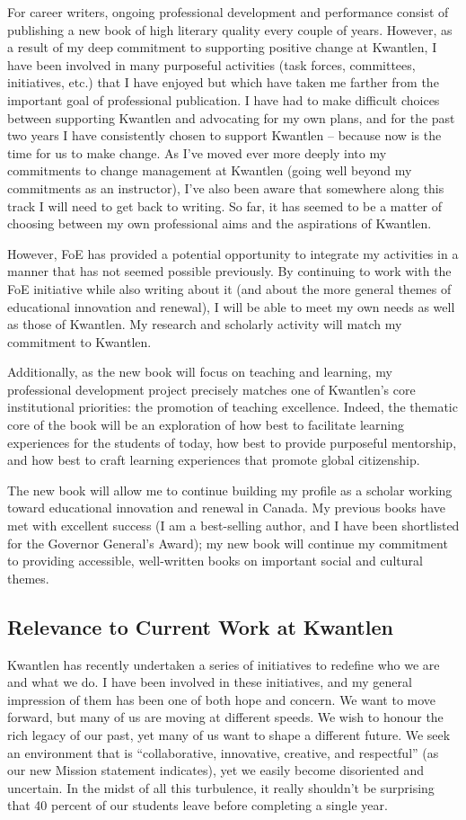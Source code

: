 \documentclass[letterpaper,10pt,headsepline]{scrreprt}
\begin{document}
For career writers, ongoing professional development and performance consist of publishing a new book of high literary quality every couple of years. However, as a result of my deep commitment to supporting positive change at Kwantlen, I have been involved in many purposeful activities (task forces, committees, initiatives, etc.) that I have enjoyed but which have taken me farther from the important goal of professional publication. I have had to make difficult choices between supporting Kwantlen and advocating for my own plans, and for the past two years I have consistently chosen to support Kwantlen -- because now is the time for us to make change. As I've moved ever more deeply into my commitments to change management at Kwantlen (going well beyond my commitments as an instructor), I've also been aware that somewhere along this track I will need to get back to writing. So far, it has seemed to be a matter of choosing between my own professional aims and the aspirations of Kwantlen.

However, FoE has provided a potential opportunity to integrate my activities in a manner that has not seemed possible previously. By continuing to work with the FoE initiative while also writing about it (and about the more general themes of educational innovation and renewal), I will be able to meet my own needs as well as those of Kwantlen. My research and scholarly activity will match my commitment to Kwantlen.

Additionally, as the new book will focus on teaching and learning, my professional development project precisely matches one of Kwantlen's core institutional priorities: the promotion of teaching excellence. Indeed, the thematic core of the book will be an exploration of how best to facilitate learning experiences for the students of today, how best to provide purposeful mentorship, and how best to craft learning experiences that promote global citizenship.

The new book will allow me to continue building my profile as a scholar working toward educational innovation and renewal in Canada. My previous books have met with excellent success (I am a best-selling author, and I have been shortlisted for the Governor General's Award); my new book will continue my commitment to providing accessible, well-written books on important social and cultural themes.
\subsection{Relevance to Current Work at Kwantlen}
\label{sec-3-2}
Kwantlen has recently undertaken a series of initiatives to redefine who we are and what we do. I have been involved in these initiatives, and my general impression of them has been one of both hope and concern. We want to move forward, but many of us are moving at different speeds. We wish to honour the rich legacy of our past, yet many of us want to shape a different future. We seek an environment that is ``collaborative, innovative, creative, and respectful'' (as our new Mission statement indicates), yet we easily become disoriented and uncertain. In the midst of all this turbulence, it really shouldn't be surprising that 40 percent of our students leave before completing a single year.
\end{document}
